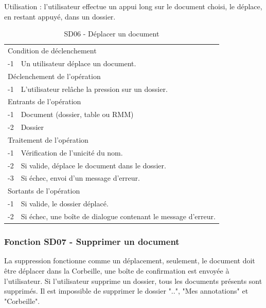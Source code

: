 \documentclass[a4paper]{article}
\begin{document}
Utilisation : l'utilisateur effectue un appui long sur le document choisi, le déplace, en restant appuyé, dans un dossier.

\begin{table}[H]
  \centering
   \small
	\begin{tabular}{|c|p{12cm}|}
   		\hline
   			\rowcolor{lightgray}\multicolumn{2}{|c|}{\textbf{SD06 - Déplacer un document}} \\
   		\hline
   			\multicolumn{2}{|l|}{Condition de d\'eclenchement} \\
   		\hline
   			-1 & Un utilisateur déplace un document.\\
   		\hline
   			\multicolumn{2}{|l|}{D\'eclenchement de l'op\'eration} \\
   		\hline
   			-1 & L'utilisateur relâche la pression sur un dossier.\\
   		\hline
   			\multicolumn{2}{|l|}{Entrants de l'op\'eration} \\
   		\hline
   			-1 & Document (dossier, table ou RMM)\\
        		-2 & Dossier\\
   		\hline
   			\multicolumn{2}{|l|}{Traitement de l'op\'eration} \\
  		\hline
   			-1 & Vérification de l'unicité du nom. \\
			-2 & Si valide, déplace le document dans le dossier. \\
			-3 & Si échec, envoi d'un message d'erreur. \\
   		\hline
   			\multicolumn{2}{|l|}{Sortants de l'op\'eration} \\
   		\hline
   			-1 & Si valide, le dossier déplacé. \\
			-2 & Si échec, une boîte de dialogue contenant le message d'erreur. \\
   		\hline
	\end{tabular}
  \caption{SD06 - Déplacer un document}
  \normalsize
  \label{tab:deplacer_document}
\end{table}

\subsubsection{Fonction SD07 - Supprimer un document}
La suppression fonctionne comme un déplacement, seulement, le document doit être déplacer dans la Corbeille, une boîte de confirmation est envoyée à l'utilisateur.
Si l'utilisateur supprime un dossier, tous les documents présents sont supprimés.
Il est impossible de supprimer le dossier "..", "Mes annotations" et "Corbeille".
\end{document}
